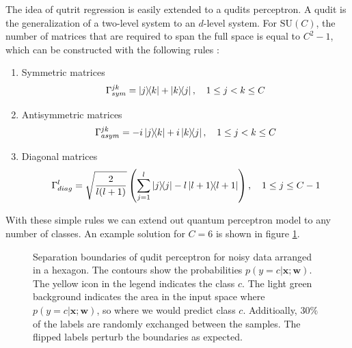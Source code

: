 \clearpage

\noindent The idea of qutrit regression is easily extended to a qudits perceptron. A qudit is the generalization of a two-level system to an $d$-level system. For $\text{SU}(C)$, the number of matrices that are required to span the full space is equal to $C^2-1$, which can be constructed with the following rules \cite{Bertlmann2008}:
\begin{enumerate}
    \item Symmetric matrices\\
    \begin{align*}
        \Gamma^{jk}_{sym} = \ketbra{j}{k}+\ketbra{k}{j}, \quad 1\leq j<k\leq C
    \end{align*}
        \item Antisymmetric matrices \\
    \begin{align*}
        \Gamma^{jk}_{asym} = -i\ketbra{j}{k}+i\ketbra{k}{j}, \quad 1\leq j<k\leq C
    \end{align*}
            \item Diagonal matrices \\
    \begin{align*}
        \Gamma^{l}_{diag} = \sqrt{\frac{2}{l(l+1)}}\left(\sum^l_{j=1}\ketbra{j}{j}-l\ketbra{l+1}{l+1}\right), \quad 1\leq j\leq C-1
    \end{align*}
\end{enumerate}
With these simple rules we can extend out quantum perceptron model to any number of classes. An example solution for $C=6$ is shown in figure \ref{fig:qm_mn_5}.
\begin{figure}[htb!]
    \centering
    \caption{Separation boundaries of qudit perceptron for noisy data arranged in a hexagon. The contours show the probabilities $p(y=c|\mathbf{x};\mathbf{w})$. The yellow icon in the legend indicates the class $c$. The light green background indicates the area in the input space where $p(y=c|\mathbf{x};\mathbf{w})$, so where we would predict class $c$. Additioally, $30\%$ of the labels are randomly exchanged between the samples. The flipped labels perturb the boundaries as expected.}
    \label{fig:qm_mn_5}
\end{figure}

